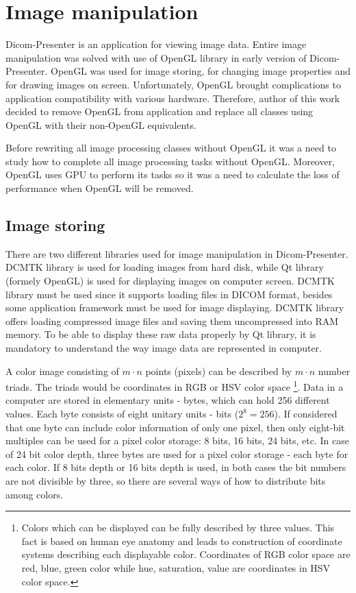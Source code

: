 \chapter{Image manipulation}
\vspace{-10mm}

Dicom-Presenter is an application for viewing image data. Entire image manipulation was solved with use of OpenGL library in early version of Dicom-Presenter. OpenGL was used for image storing, for changing image properties and for drawing images on screen. Unfortunately, OpenGL brought complications to application compatibility with various hardware. Therefore, author of this work decided to remove OpenGL from application and replace all classes using OpenGL with their non-OpenGL equivalents. 

Before rewriting all image processing classes without OpenGL it was a need to study how to complete all image processing tasks without OpenGL. Moreover, OpenGL uses GPU to perform its tasks so it was a need to calculate the loss of performance when OpenGL will be removed. 

\section{Image storing}
\label{rawdata}
There are two different libraries used for image manipulation in Dicom-Presenter. DCMTK library is used for loading images from hard disk, while Qt library (formely OpenGL) is used for displaying images on computer screen. DCMTK library must be used since it supports loading files in DICOM format, besides some application framework must be used for image displaying. DCMTK library offers loading compressed image files and saving them uncompressed into RAM memory. To be able to display these raw data properly by Qt library, it is mandatory to understand the way image data are represented in computer. 

A color image consisting of $m \cdot n$ points (pixels) can be described by $m \cdot n$ number triads. The triads would be coordinates in RGB or HSV color space \footnote{Colors which can be displayed can be fully described by three values. This fact is based on human eye anatomy and leads to construction of coordinate systems describing each displayable color. Coordinates of RGB color space are red, blue, green color while hue, saturation, value are coordinates in HSV color space.}. Data in a computer are stored in elementary units - bytes, which can hold 256 different values. Each byte consists of eight unitary units - bits ($2^8 = 256 $). If considered that one byte can include color information of only one pixel, then only eight-bit multiples can be used for a pixel color storage: 8 bits, 16 bits, 24 bits, etc. In case of 24 bit color depth, three bytes are used for a pixel color storage - each byte for each color. If 8 bits depth or 16 bits depth is used, in both cases the bit numbers are not divisible by three, so there are several ways of how to distribute bits among colors.
 
